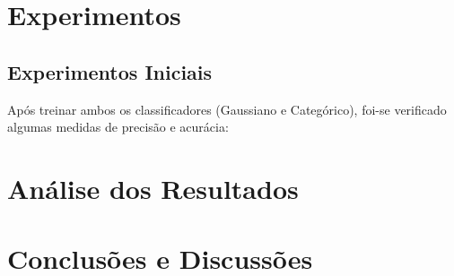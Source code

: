 \documentclass[conference]{IEEEtran}
\begin{document}
\section{Experimentos}

\subsection{Experimentos Iniciais}
Após treinar ambos os classificadores (Gaussiano e Categórico), foi-se verificado algumas medidas de precisão e acurácia:

\section{Análise dos Resultados}

\section{Conclusões e Discussões}





\nocite{*}

\end{document}
